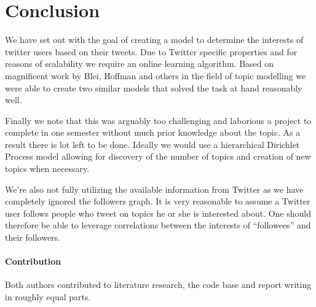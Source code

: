 \section{Conclusion}
We have set out with the goal of creating a model to determine the interests of twitter users based on their tweets. Due to Twitter specific properties and for reasons of scalability we require an online learning algorithm. Based on magnificent work by Blei, Hoffman and others in the field of topic modelling we were able to create two similar models that solved the task at hand reasonably well.

Finally we note that this was arguably too challenging and laborious a project to complete in one semester without much prior knowledge about the topic. As a result there is lot left to be done. Ideally we would use a hierarchical Dirichlet Process model allowing for discovery of the number of topics and creation of new topics when necessary.

We're also not fully utilizing the available information from Twitter as we have completely ignored the followers graph. It is very reasonable to assume a Twitter user follows people who tweet on topics he or she is interested about. One should therefore be able to leverage correlations between the interests of ``followees'' and their followers.

\paragraph{Contribution}
Both authors contributed to literature research, the code base and report writing in roughly equal parts.